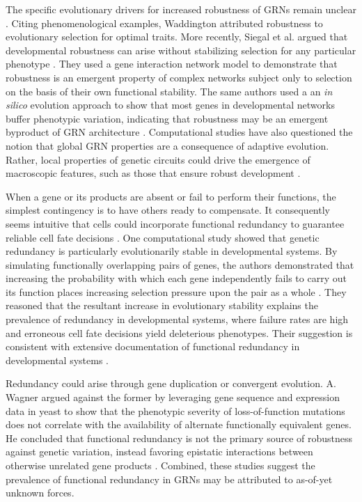 The specific evolutionary drivers for increased robustness of GRNs remain unclear \cite{Siegal2014}. Citing phenomenological examples, Waddington attributed robustness to evolutionary selection for optimal traits. More recently, Siegal et al. argued that developmental robustness can arise without stabilizing selection for any particular phenotype \cite{Siegal2002}. They used a gene interaction network model to demonstrate that robustness is an emergent property of complex networks subject only to selection on the basis of their own functional stability. The same authors used a an \textit{in silico} evolution approach to show that most genes in developmental networks buffer phenotypic variation, indicating that robustness may be an emergent byproduct of GRN architecture \cite{Bergman2003}. Computational studies have also questioned the notion that global GRN properties are a consequence of adaptive evolution. Rather, local properties of genetic circuits could drive the emergence of macroscopic features, such as those that ensure robust development \cite{Lynch2007,Wagner2003}.

When a gene or its products are absent or fail to perform their functions, the simplest contingency is to have others ready to compensate. It consequently seems intuitive that cells could incorporate functional redundancy to guarantee reliable cell fate decisions \cite{Hartman2001,McAdams1999}. One computational study showed that genetic redundancy is particularly evolutionarily stable in developmental systems. By simulating functionally overlapping pairs of genes, the authors demonstrated that increasing the probability with which each gene independently fails to carry out its function places increasing selection pressure upon the pair as a whole \cite{Nowak1997}. They reasoned that the resultant increase in evolutionary stability explains the prevalence of redundancy in developmental systems, where failure rates are high and erroneous cell fate decisions yield deleterious phenotypes. Their suggestion is consistent with extensive documentation of functional redundancy in developmental systems \cite{Kitano2004}. 

Redundancy could arise through gene duplication or convergent evolution. A. Wagner argued against the former by leveraging gene sequence and expression data in yeast to show that the phenotypic severity of loss-of-function mutations does not correlate with the availability of alternate functionally equivalent genes. He concluded that functional redundancy is not the primary source of robustness against genetic variation, instead favoring epistatic interactions between otherwise unrelated gene products \cite{Wagner2000}. Combined, these studies suggest the prevalence of functional redundancy in GRNs may be attributed to as-of-yet unknown forces.
